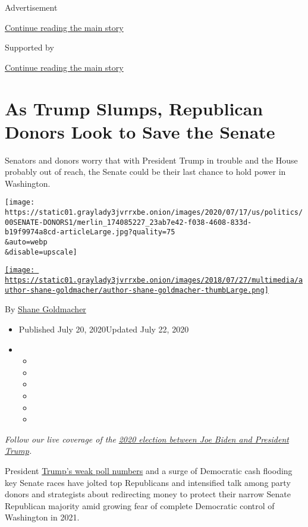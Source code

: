Advertisement

\protect\hyperlink{after-top}{Continue reading the main story}

Supported by

\protect\hyperlink{after-sponsor}{Continue reading the main story}

\hypertarget{as-trump-slumps-republican-donors-look-to-save-the-senate}{%
\section{As Trump Slumps, Republican Donors Look to Save the
Senate}\label{as-trump-slumps-republican-donors-look-to-save-the-senate}}

Senators and donors worry that with President Trump in trouble and the
House probably out of reach, the Senate could be their last chance to
hold power in Washington.

\texttt{[image: https://static01.graylady3jvrrxbe.onion/images/2020/07/17/us/politics/00SENATE-DONORS1/merlin\_174085227\_23ab7e42-f038-4608-833d-b19f9974a8cd-articleLarge.jpg?quality=75\\\&auto=webp\\\&disable=upscale]}

\href{https://www.nytimes3xbfgragh.onion/by/shane-goldmacher}{\texttt{[image: https://static01.graylady3jvrrxbe.onion/images/2018/07/27/multimedia/author-shane-goldmacher/author-shane-goldmacher-thumbLarge.png]}}

By \href{https://www.nytimes3xbfgragh.onion/by/shane-goldmacher}{Shane
Goldmacher}

\begin{itemize}
\item
  Published July 20, 2020Updated July 22, 2020
\item
  \begin{itemize}
  \item
  \item
  \item
  \item
  \item
  \item
  \end{itemize}
\end{itemize}

\emph{Follow our live coverage of the}
\href{https://www.nytimes3xbfgragh.onion/2020/07/27/us/elections/biden-vs-trump.html}{\emph{2020
election between Joe Biden and President Trump}}\emph{.}

President
\href{https://www.nytimes3xbfgragh.onion/2020/07/22/us/politics/trump-polls-2020.html}{Trump's
weak poll numbers} and a surge of Democratic cash flooding key Senate
races have jolted top Republicans and intensified talk among party
donors and strategists about redirecting money to protect their narrow
Senate Republican majority amid growing fear of complete Democratic
control of Washington in 2021.


